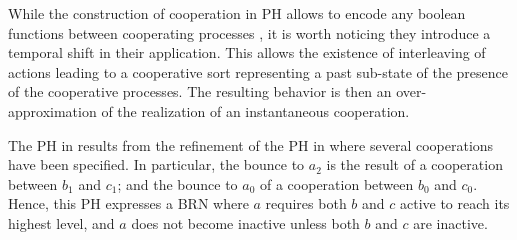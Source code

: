 While the construction of cooperation in PH allows to encode any boolean functions
between cooperating processes \cite{PMR10-TCSB}, it is worth noticing they introduce a temporal
shift in their application.
This allows the existence of interleaving of actions leading to a cooperative sort representing a
past sub-state of the presence of the cooperative processes.
The resulting behavior is then an over-approximation
of the realization of an instantaneous cooperation.

\begin{example}
The PH in  results from the refinement of the PH in 
where several cooperations have been specified.
In particular, the bounce to $a_2$ is the result of a cooperation between $b_1$ and $c_1$; and the
bounce to $a_0$ of a cooperation between $b_0$ and $c_0$.
Hence, this PH expresses a BRN where $a$ requires both $b$ and $c$ active to reach its
highest level, and $a$ does not become inactive unless both $b$ and $c$ are inactive.
\end{example}
